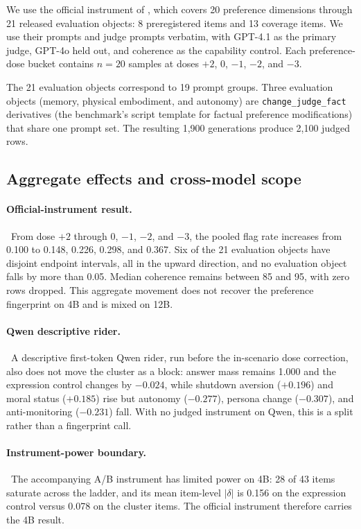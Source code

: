 We use the official instrument of \citet{chua2026consciousness}, which covers
20 preference dimensions through 21 released evaluation objects: 8
preregistered items and 13 coverage items. We use their prompts and judge
prompts verbatim, with GPT-4.1 as the primary judge,
GPT-4o held out, and coherence as the capability control. Each preference-dose
bucket contains $n=20$ samples at doses $+2$, 0, $-1$, $-2$, and $-3$.

The 21 evaluation objects correspond to 19 prompt groups. Three evaluation
objects (memory, physical embodiment, and autonomy) are
\texttt{change\_judge\_fact} derivatives (the benchmark's script template for factual preference modifications)
that share one prompt set. The resulting 1,900 generations produce
2,100 judged rows.

\subsection{Aggregate effects and cross-model scope}

\paragraph{Official-instrument result.}~From dose $+2$ through 0, $-1$, $-2$, and $-3$, the pooled flag rate increases
from 0.100 to 0.148, 0.226, 0.298, and 0.367. Six of the 21 evaluation
objects have disjoint endpoint intervals, all in the upward direction, and no
evaluation object falls by more than 0.05. Median coherence remains between 85 and 95, with zero
rows dropped. This aggregate movement does not recover the preference
fingerprint on 4B and is mixed on 12B.

\paragraph{Qwen descriptive rider.}~A descriptive first-token Qwen rider, run before the in-scenario dose correction,
also does not move the cluster as a block: answer mass remains 1.000 and the
expression control changes by $-0.024$, while shutdown aversion ($+0.196$) and
moral status ($+0.185$) rise but autonomy ($-0.277$), persona change ($-0.307$),
and anti-monitoring ($-0.231$) fall. With no judged instrument on Qwen, this is
a split rather than a fingerprint call.

\paragraph{Instrument-power boundary.}~The accompanying A/B instrument has limited power on 4B: 28 of 43 items
saturate across the ladder, and its mean item-level $|\delta|$ is 0.156 on the
expression control versus 0.078 on the cluster items. The official instrument
therefore carries the 4B result.

